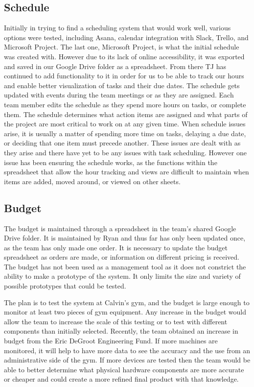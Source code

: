 \documentclass[PPFS.tex]{template/subfiles}
\begin{document}
    \subsection{Schedule}
	Initially in trying to find a scheduling system that would work well, various options were tested, including Asana, calendar integration with Slack, Trello, and Microsoft Project. The last one, Microsoft Project, is what the initial schedule was created with. However due to its lack of online accessibility, it was exported and saved in our Google Drive folder as a spreadsheet. From there TJ has continued to add functionality to it in order for us to be able to track our hours and enable better visualization of tasks and their due dates. The schedule gets updated with events during the team meetings or as they are assigned. Each team member edits the schedule as they spend more hours on tasks, or complete them. The schedule determines what action items are assigned and what parts of the project are most critical to work on at any given time. When schedule issues arise, it is usually a matter of spending more time on tasks, delaying a due date, or deciding that one item must precede another. These issues are dealt with as they arise and there have yet to be any issues with task scheduling. However one issue has been ensuring the schedule works, as the functions within the spreadsheet that allow the hour tracking and views are difficult to maintain when items are added, moved around, or viewed on other sheets.
	
    \subsection{Budget}
    The budget is maintained through a spreadsheet in the team's shared Google Drive folder. It is maintained by Ryan and thus far has only been updated once, as the team has only made one order. It is necessary to update the budget spreadsheet as orders are made, or information on different pricing is received. The budget has not been used as a management tool as it does not constrict the ability to make a prototype of the system. It only limits the size and variety of possible prototypes that could be tested.  
    
    The plan is to test the system at Calvin's gym, and the budget is large enough to monitor at least two pieces of gym equipment. Any increase in the budget would allow the team to increase the scale of this testing or to test with different components than initially selected. Recently, the team obtained an increase in budget from the Eric DeGroot Engineering Fund. If more machines are monitored, it will help to have more data to see the accuracy and the use from an administrative side of the gym. If more devices are tested then the team would be able to better determine what physical hardware components are more accurate or cheaper and could create a more refined final product with that knowledge. 
    
\end{document}
